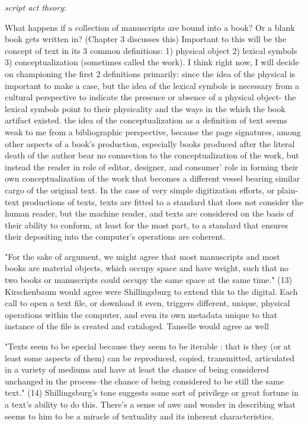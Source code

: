 \documentclass[course, english]{Notes}
\begin{document}
\emph{script act theory}: 

What happens if a collection of manuscripts are bound into a book? Or a blank book gets written in? (Chapter 3 discusses this)
	 {Important to this will be the concept of text in its 3 common definitions: 1) physical object 2) lexical symbols 3) conceptualization (sometimes called the work).}
	 {I think right now, I will decide on championing the first 2 definitions primarily: since the idea of the physical is important to make a case, but the idea of the lexical symbols is necessary from a cultural perspective to indicate the presence or absence of a physical object- the lexical symbols point to their physicality and the ways in the which the book artifact existed.}
	 {the idea of the conceptualization as a definition of text seems weak to me from a bibliographic perspective, because the page signatures, among other aspects of a book's production, especially books produced after the literal death of the author bear no connection to the conceptualization of the work, but instead the reader in role of editor, designer, and consumer' role in forming their own conceptualization of the work that becomes a different vessel bearing similar cargo of the original text.}
	 {In the case of very simple digitization efforts, or plain-text productions of texts, texts are fitted to a standard that does not consider the human reader, but the machine reader, and texts are considered on the basis of their ability to conform, at least for the most part, to a standard that ensures their depositing into the computer's operations are coherent.}
	
"For the sake of argument, we might agree that most manuscripts and most books are material objects, which occupy space and have weight, such that no two books or manuscripts could occupy the same space at the same time." (13)
	 {Kirschenbaum would agree were Shillingsburg to extend this to the digital. Each call to open a text file, or download it even, triggers different, unique, physical operations within the computer, and even its own metadata unique to that instance of the file is created and cataloged.}
	 {Tanselle would agree as well}

"Texts seem to be special because they seem to be iterable : that is they (or at least some aspects of them) can be reproduced, copied, transmitted, articulated in a variety of mediums and have at least the chance of being considered unchanged in the process--the chance of being considered to be still the same text." (14)
	 {Shillingsburg's tone suggests some sort of privilege or great fortune in a text's ability to do this. There's a sense of awe and wonder in describing what seems to him to be a miracle of textuality and its inherent characteristics.}
\end{document}
